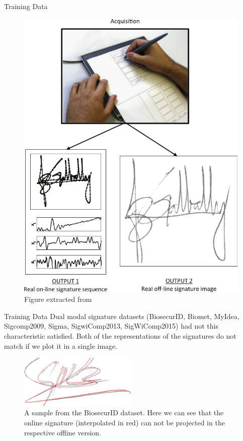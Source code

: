 \documentclass{beamer}
\begin{document}
\begin{frame}{Training Data}


\begin{figure}[!htb]
\centering
\includegraphics[height=0.82\textheight]{dualonoff}

\caption{Figure extracted from \parencite{galbally2015line}}
\label{fig:dualonoff}
\end{figure}
\end{frame}

\begin{frame}{Training Data}
Dual modal signature datasets (BiosecurID, Biomet, MyIdea, Sigcomp2009, Sigma, SigwiComp2013, SigWiComp2015)  had not this characteristic satisfied. Both of the representations of the signatures do not match if we plot it in a single image.

\begin{figure}[!htb]
\centering
\includegraphics[width=0.5\textwidth]{onoff}
\caption{A sample from the BiosecurID dataset. Here we can see that the online signature (interpolated in red) can not be projected in the respective offline version.}
\label{fig:onoff}
\end{figure}
\end{frame}
\end{document}
